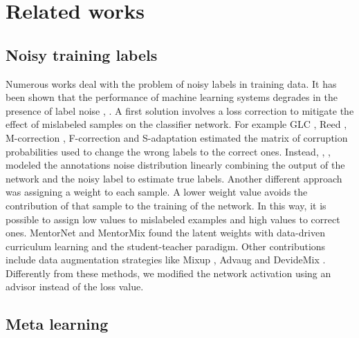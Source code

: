 \documentclass[runningheads]{llncs}
\begin{document}
	\section{Related works}
	
	\subsection{Noisy training labels}
	
	Numerous works deal with the problem of noisy labels in training data. It has been shown that the performance of machine learning systems degrades in the presence of label noise \cite{nettleton2010study}, \cite{pechenizkiy2006class}. A first solution involves a loss correction to mitigate the effect of mislabeled samples on the classifier network. For example GLC \cite{hendrycks2018using}, Reed \cite{reed2014training}, M-correction \cite{arazo2019unsupervised}, F-correction \cite{goldberger2016training} and S-adaptation \cite{patrini2017making} estimated the matrix of corruption probabilities used to change the wrong labels to the correct ones. Instead, \cite{tanaka2018joint}, \cite{ma2018dimensionality}, \cite{yi2019probabilistic} modeled the annotations noise distribution linearly combining the output of the network and the noisy label to estimate true labels. Another different approach was assigning a weight to each sample. A lower weight value avoids the contribution of that sample to the training of the network. In this way, it is possible to assign low values to mislabeled examples and high values to correct ones. MentorNet \cite{jiang2018mentornet} and MentorMix \cite{jiang2020beyond} found the latent weights with data-driven curriculum learning and the student-teacher paradigm. Other contributions include data augmentation strategies like Mixup \cite{zhang2018mixup}, Advaug \cite{cheng2020advaug} and DevideMix \cite{li2019dividemix}. Differently from these methods, we modified the network activation using an advisor instead of the loss value.
	
	\subsection{Meta learning}
	
\end{document}
